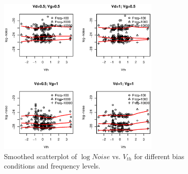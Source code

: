 \documentclass[sn-mathphys]{sn-jnl}%
\theoremstyle{thmstyleone}%
\theoremstyle{thmstyletwo}%
\theoremstyle{thmstylethree}%
\begin{document}
\begin{figure}[ht]
	\centerline{
		\includegraphics[width=0.7\textwidth]{Fig6_lognoiseVSvth.eps}}
	\caption{Smoothed scatterplot of $\log Noise$ vs. $V_{th}$ for different  bias conditions and frequency levels. }
	\label{fig:lognoiseVSvth}
\end{figure}
\end{document}
